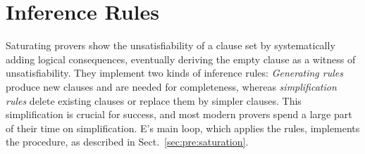


\section{Inference Rules}
\label{sec:ehoh:inferences}

Saturating provers show the unsatisfiability of a clause set
by systematically adding logical consequences,
eventually deriving the empty clause
as a witness of unsatisfiability. They implement two kinds of
inference rules: \emph{Generating rules} produce new clauses and are
needed for completeness, whereas \emph{simplification rules} delete
existing clauses or replace them by simpler clauses. This
simplification is crucial for success, and most modern provers spend a
large part of their time on simplification. E's main loop, which applies the
rules, implements the  procedure, as described in
Sect.~\ref{sec:pre:saturation}. 


